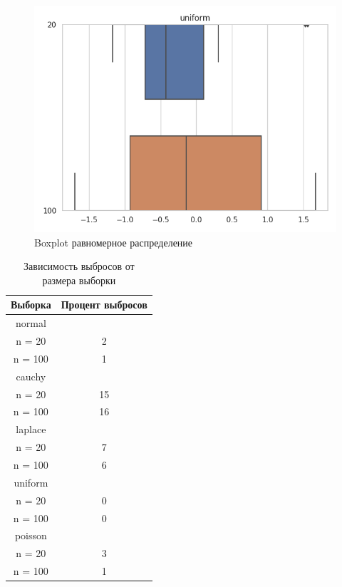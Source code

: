 \documentclass[12pt]{report}
\begin{document}
\begin{center}
\begin{figure}[H]
 \caption{Boxplot равномерное распределение }
\includegraphics[scale = 0.7]{../lab_3/pic/uniform.png}
\end{figure}

\begin{table}[H]
\caption{Зависимость выбросов от размера выборки}
\label{tab:my_label2}
\begin{center}
\vspace{5mm}
\begin{tabular}{|c|c|}
\hline
Выборка & Процент выбросов\\
\hline
normal&\\
\hline
n = 20    &2    \\
\hline
n = 100   &1    \\
\hline
cauchy&\\
\hline
n = 20    &15    \\
\hline
n = 100   &16    \\
\hline
laplace&\\
\hline
n = 20    &7    \\
\hline
n = 100   &6    \\
\hline
uniform &\\
\hline
n = 20    &0   \\
\hline
n = 100   &0    \\
\hline
poisson &
\\
\hline
n = 20    &3    \\
\hline
n = 100   &1    \\
\hline

\end{tabular}
\end{center}
\end{table}
\end{center}
\end{document}
